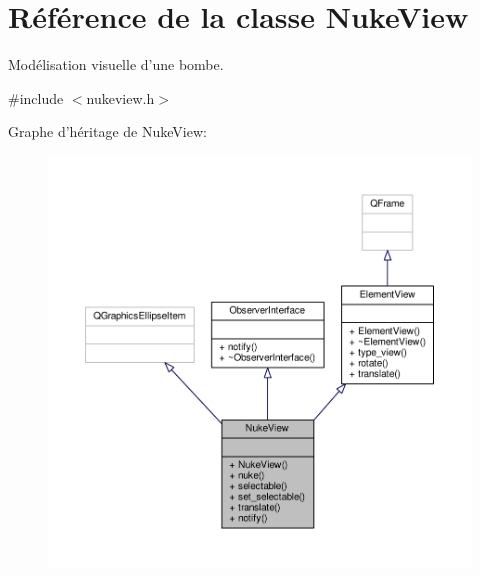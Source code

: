 \hypertarget{classNukeView}{\section{Référence de la classe Nuke\+View}
\label{classNukeView}
}


Modélisation visuelle d’une bombe.  




{\ttfamily \#include $<$nukeview.\+h$>$}



Graphe d'héritage de Nuke\+View\+:
\nopagebreak
\begin{figure}[H]
\begin{center}
\leavevmode
\includegraphics[width=350pt]{da/d21/classNukeView__inherit__graph}
\end{center}
\end{figure}


